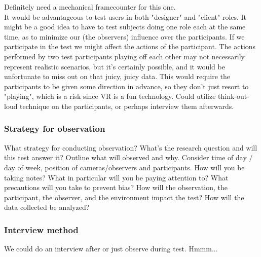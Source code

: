 Definitely need a mechanical framecounter for this one. \\ %
It would be advantageous to test users in both "designer" and "client" roles. It might be a good idea to have to test subjects doing one role each at the same time, as to minimize our (the observers) influence over the participants. If we participate in the test we might affect the actions of the participant. The actions performed by two test participants playing off each other may not necessarily represent realistic scenarios, but it's certainly possible, and it would be unfortunate to miss out on that juicy, juicy data. This would require the participants to be given some direction in advance, so they don't just resort to "playing", which is a risk since VR is a fun technology. Could utilize think-out-loud technique on the participants, or perhaps interview them afterwards.
\subsubsection{Strategy for observation}
What strategy for conducting observation? What's the research question and will this test answer it? Outline what will observed and why. Consider time of day / day of week, position of cameras/observers and participants. How will you be taking notes? What in particular will you be paying attention to? What precautions will you take to prevent bias? How will the observation, the participant, the observer, and the environment impact the test? 
How will the data collected be analyzed?
\subsubsection{Interview method}
We could do an interview after or just observe during test. Hmmm...